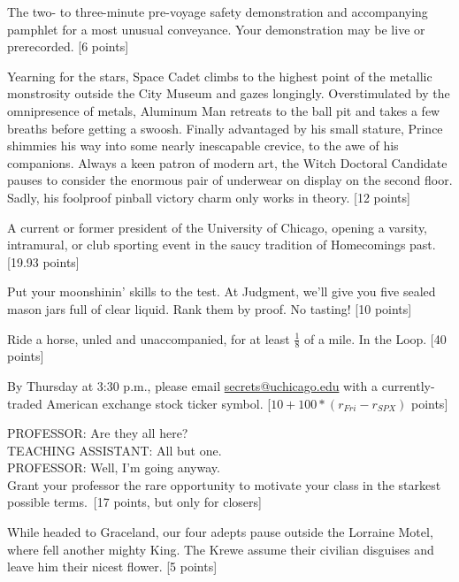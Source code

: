 \documentclass{book}
\begin{document}
\begin{list}{}{}
\item The two- to three-minute pre-voyage safety demonstration and accompanying pamphlet for a most unusual conveyance. Your demonstration may be live or prerecorded. [6 points]

\item Yearning for the stars, Space Cadet climbs to the highest point of the metallic monstrosity outside the City Museum and gazes longingly. Overstimulated by the omnipresence of metals, Aluminum Man retreats to the ball pit and takes a few breaths before getting a swoosh. Finally advantaged by his small stature, Prince shimmies his way into some nearly inescapable crevice, to the awe of his companions. Always a keen patron of modern art, the Witch Doctoral Candidate pauses to consider the enormous pair of underwear on display on the second floor. Sadly, his foolproof pinball victory charm only works in theory. [12 points] 

\item A current or former president of the University of Chicago, opening a varsity, intramural, or club sporting event in the saucy tradition of Homecomings past. [19.93 points]

\item Put your moonshinin' skills to the test. At Judgment, we'll give you five sealed mason jars full of clear liquid. Rank them by proof. No tasting! [10 points] 

\item Ride a horse, unled and unaccompanied, for at least $\frac{1}{8}$ of a mile. In the Loop. [40 points]

\item By Thursday at 3:30 p.m., please email \url{secrets@uchicago.edu} with a currently-traded American exchange stock ticker symbol. [$10 + 100*(r_{Fri} - r_{SPX})$ points] 


\item PROFESSOR: Are they all here? \\
TEACHING ASSISTANT: All but one. \\
PROFESSOR: Well, I'm going anyway. \\
Grant your professor the rare opportunity to motivate your class in the starkest possible terms.\ [17 points, but only for closers]

\item While headed to Graceland, our four adepts pause outside the Lorraine Motel, where fell another mighty King. The Krewe assume their civilian disguises and leave him their nicest flower. [5 points] 


\end{list}
\end{document}
